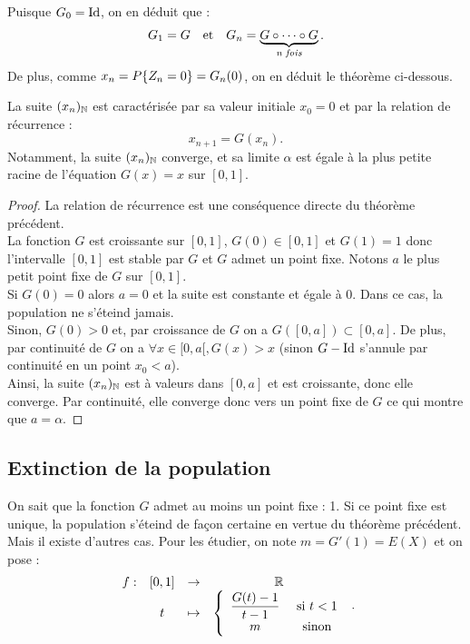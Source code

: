 Puisque $G_0=\operatorname{Id}$, on en déduit que :
\[ G_1 = G \quad \text{et} \quad G_n = \underbrace{G \circ \cdots \circ G}_{\textit{n fois}} . \]
De plus, comme $x_n = P \{ Z_n=0 \} = G_n(0)$, on en déduit le théorème ci-dessous.

\begin{thm}
La suite $(x_n)_{\mathbb{N}}$ est caractérisée par sa valeur initiale $x_0=0$ et par la relation de récurrence :
\[ x_{n+1} = G(x_n) . \]
Notamment, la suite $(x_n)_{\mathbb{N}}$ converge, et sa limite $\alpha$ est égale à la plus petite racine de l'équation $G(x) = x$ sur $[0,1]$.
\end{thm}

\begin{proof}
La relation de récurrence est une conséquence directe du théorème précédent. \\
La fonction $G$ est croissante sur $[0,1]$, $G(0) \in [0,1]$ et $G(1) = 1$ donc l'intervalle $[0,1]$ est stable par $G$ 
et $G$ admet un point fixe.
Notons $a$ le plus petit point fixe de $G$ sur $[0,1]$. \\
Si $G(0)=0$ alors $a=0$ et la suite est constante et égale à 0. Dans ce cas, la population ne s'éteind jamais. \\
Sinon, $G(0) > 0$ et, par croissance de $G$ on a $G([0,a]) \subset [0,a]$. De plus, par continuité de $G$ on a 
$\forall x \in [0, a[, G(x) > x$ (sinon $G-\operatorname{Id}$ s'annule par continuité en un point $x_0<a$). \\
Ainsi, la suite $(x_n)_{\mathbb{N}}$ est à valeurs dans $[0,a]$ et est croissante, donc elle converge. Par continuité, elle converge donc vers un point
fixe de $G$ ce qui montre que $a = \alpha$.
\end{proof}

\subsection{Extinction de la population}

On sait que la fonction $G$ admet au moins un point fixe : 1. Si ce point fixe est unique, la population s'éteind de façon certaine en 
vertue du théorème précédent. Mais il existe d'autres cas. Pour les étudier, on note $m=G'(1)=E(X)$ et on pose :
\[ \begin{array}{c c c c}
f : & [0,1] & \to & \mathbb{R} \\
& t & \mapsto & \left \{ \begin{array}{c c} \dfrac{G(t)-1}{t-1} & \text{ si } t < 1 \\ m & \text{ sinon} \end{array} \right.
\end{array} . \]


